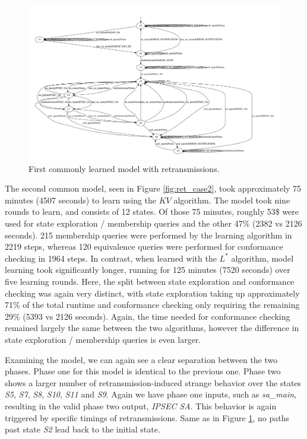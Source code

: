 \begin{figure}[ht]
	\centering
	\includegraphics[width=\linewidth]{images/models/retransmissions/retrans_case1}
	\caption{First commonly learned model with retransmissions.}
	\label{fig:ret_case1}
\end{figure}

The second common model, seen in Figure \ref{fig:ret_case2}, took approximately 75 minutes (4507 seconds) to learn using the $KV$ algorithm. The model took nine rounds to learn, and consists of 12 states. Of those 75 minutes, roughly 53\$ were used for state exploration / membership queries and the other 47\% (2382 vs 2126 seconds). 215 membership queries were performed by the learning algorithm in 2219 steps, whereas 120 equivalence queries were performed for conformance checking in 1964 steps. In contrast, when learned with the $L^*$ algorithm, model learning took significantly longer, running for 125 minutes (7520 seconds) over five learning rounds. Here, the split between state exploration and conformance checking was again very distinct, with state exploration taking up approximately 71\% of the total runtime and conformance checking only requiring the remaining 29\% (5393 vs 2126 seconds). Again, the time needed for conformance checking remained largely the same between the two algorithms, however the difference in state exploration / membership queries is even larger.

Examining the model, we can again see a clear separation between the two phases. Phase one for this model is identical to the previous one. Phase two shows a larger number of retransmission-induced strange behavior over the states \emph{S5}, \emph{S7}, \emph{S8}, \emph{S10}, \emph{S11} and \emph{S9}. Again we have phase one inputs, such as \emph{sa\_main}, resulting in the valid phase two output, \emph{IPSEC SA}. This behavior is again triggered by specific timings of retransmissions. Same as in Figure \ref{fig:ret_case1}, no paths past state \emph{S2} lead back to the initial state.

